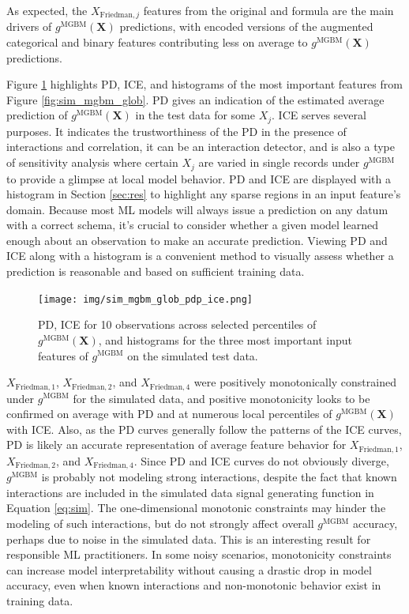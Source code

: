 \documentclass[information,article,submit,moreauthors,pdftex]{definitions/mdpi}
\begin{document}
\noindent As expected, the $X_{\text{Friedman},j}$ features from the original \citet{friedman1979tree} and \citet{friedman1991multivariate} formula are the main drivers of $g^\text{MGBM}(\mathbf{X})$ predictions, with encoded versions of the augmented categorical and binary features contributing less on average to $g^\text{MGBM}(\mathbf{X})$ predictions. 

Figure \ref{fig:sim_mgbm_glob_pdp_ice} highlights PD, ICE, and histograms of the most important features from Figure \ref{fig:sim_mgbm_glob}. PD gives an indication of the estimated average prediction of $g^\text{MGBM}(\mathbf{X})$ in the test data for some $X_j$. ICE serves several purposes. It indicates the trustworthiness of the PD in the presence of interactions and correlation, it can be an interaction detector, and is also a type of sensitivity analysis where certain $X_j$ are varied in single records under $g^\text{MGBM}$ to provide a glimpse at local model behavior. PD and ICE are displayed with a histogram in Section \ref{sec:res} to highlight any sparse regions in an input feature's domain. Because most ML models will always issue a prediction on any datum with a correct schema, it's crucial to consider whether a given model learned enough about an observation to make an accurate prediction. Viewing PD and ICE along with a histogram is a convenient method to visually assess whether a prediction is reasonable and based on sufficient training data.

\begin{figure}[H]
	\centering
	\texttt{[image: img/sim\_mgbm\_glob\_pdp\_ice.png]}
	\caption{PD, ICE for 10 observations across selected percentiles of $g^\text{MGBM}(\mathbf{X})$, and histograms for the three most important input features of $g^\text{MGBM}$ on the simulated test data.}
	\label{fig:sim_mgbm_glob_pdp_ice}
\end{figure}   

$X_{\text{Friedman},1}$, $X_{\text{Friedman},2}$, and $X_{\text{Friedman},4}$ were positively monotonically constrained under $g^\text{MGBM}$ for the simulated data, and positive monotonicity looks to be confirmed on average with PD and at numerous local percentiles of $g^\text{MGBM}(\mathbf{X})$ with ICE. Also, as the PD curves generally follow the patterns of the ICE curves, PD is likely an accurate representation of average feature behavior for $X_{\text{Friedman},1}$, $X_{\text{Friedman},2}$, and $X_{\text{Friedman},4}$. Since PD and ICE curves do not obviously diverge, $g^\text{MGBM}$ is probably not modeling strong interactions, despite the fact that known interactions are included in the simulated data signal generating function in Equation \ref{eq:sim}. The one-dimensional monotonic constraints may hinder the modeling of such interactions, but do not strongly affect overall $g^\text{MGBM}$ accuracy, perhaps due to noise in the simulated data. This is an interesting result for responsible ML practitioners. In some noisy scenarios, monotonicity constraints can increase model interpretability without causing a drastic drop in model accuracy, even when known interactions and non-monotonic behavior exist in training data.
\end{document}
